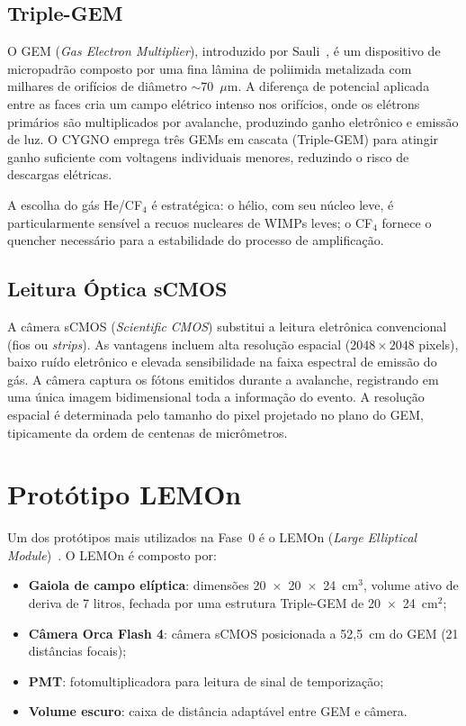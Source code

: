 \documentclass[
       oneside,
       english,
       brazil
       ]{abntbibufjf}
\begin{document}
\subsection{Triple-GEM}

O GEM (\textit{Gas Electron Multiplier}), introduzido por Sauli~\cite{sauli2016gem},
é um dispositivo de micropadrão composto por uma fina lâmina de poliimida
metalizada com milhares de orifícios de diâmetro ${\sim}70$~$\mu$m. A
diferença de potencial aplicada entre as faces cria um campo elétrico intenso
nos orifícios, onde os elétrons primários são multiplicados por avalanche,
produzindo ganho eletrônico e emissão de luz. O CYGNO emprega três GEMs em
cascata (Triple-GEM) para atingir ganho suficiente com voltagens individuais
menores, reduzindo o risco de descargas elétricas.

A escolha do gás He/CF$_4$ é estratégica: o hélio, com seu núcleo leve, é
particularmente sensível a recuos nucleares de WIMPs leves; o CF$_4$ fornece
o quencher necessário para a estabilidade do processo de amplificação.

\subsection{Leitura Óptica sCMOS}

A câmera sCMOS (\textit{Scientific CMOS}) substitui a leitura eletrônica
convencional (fios ou \textit{strips}). As vantagens incluem alta resolução
espacial ($2048 \times 2048$ pixels), baixo ruído eletrônico e elevada
sensibilidade na faixa espectral de emissão do gás. A câmera captura os
fótons emitidos durante a avalanche, registrando em uma única imagem
bidimensional toda a informação do evento. A resolução espacial é determinada
pelo tamanho do pixel projetado no plano do GEM, tipicamente da ordem de
centenas de micrômetros.

\section{Protótipo LEMOn}
\label{sec:lemon}

Um dos protótipos mais utilizados na Fase~0 é o LEMOn (\textit{Large
Elliptical Module})~\cite{bib:jinst_orange2}. O LEMOn é composto por:
\begin{itemize}
    \item \textbf{Gaiola de campo elíptica}: dimensões 20~$\times$~20~$\times$~24~cm$^3$,
    volume ativo de deriva de 7 litros, fechada por uma estrutura Triple-GEM
    de 20~$\times$~24~cm$^2$;
    \item \textbf{Câmera Orca Flash 4}: câmera sCMOS posicionada a 52,5~cm do
    GEM (21 distâncias focais);
    \item \textbf{PMT}: fotomultiplicadora para leitura de sinal de
    temporização;
    \item \textbf{Volume escuro}: caixa de distância adaptável entre GEM e
    câmera.
\end{itemize}
\end{document}
